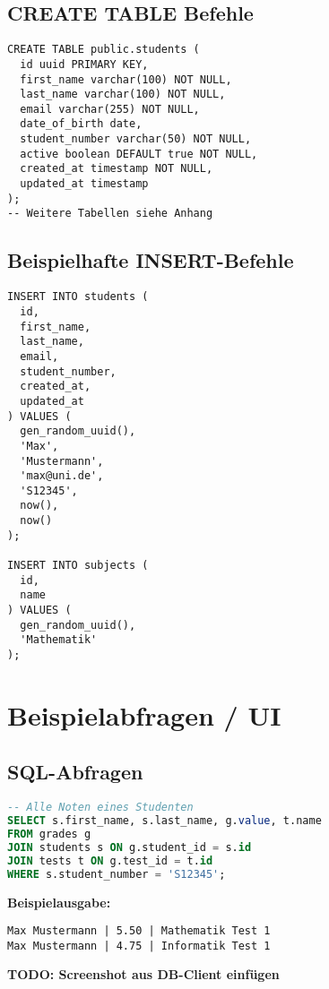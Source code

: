 \documentclass[12pt,a4paper]{article}
\begin{document}
    \subsection{CREATE TABLE Befehle}
    \begin{lstlisting}
CREATE TABLE public.students (
  id uuid PRIMARY KEY,
  first_name varchar(100) NOT NULL,
  last_name varchar(100) NOT NULL,
  email varchar(255) NOT NULL,
  date_of_birth date,
  student_number varchar(50) NOT NULL,
  active boolean DEFAULT true NOT NULL,
  created_at timestamp NOT NULL,
  updated_at timestamp
);
-- Weitere Tabellen siehe Anhang
    \end{lstlisting}

    \subsection{Beispielhafte INSERT-Befehle}
    \begin{lstlisting}
INSERT INTO students (
  id,
  first_name,
  last_name,
  email,
  student_number,
  created_at,
  updated_at
) VALUES (
  gen_random_uuid(),
  'Max',
  'Mustermann',
  'max@uni.de',
  'S12345',
  now(),
  now()
);

INSERT INTO subjects (
  id,
  name
) VALUES (
  gen_random_uuid(),
  'Mathematik'
);
    \end{lstlisting}

    \section{Beispielabfragen / UI}

    \subsection{SQL-Abfragen}
    \begin{lstlisting}[language=SQL]
-- Alle Noten eines Studenten
SELECT s.first_name, s.last_name, g.value, t.name
FROM grades g
JOIN students s ON g.student_id = s.id
JOIN tests t ON g.test_id = t.id
WHERE s.student_number = 'S12345';
    \end{lstlisting}

    \textbf{Beispielausgabe:}
    \begin{verbatim}
Max Mustermann | 5.50 | Mathematik Test 1
Max Mustermann | 4.75 | Informatik Test 1
    \end{verbatim}

    \textbf{TODO: Screenshot aus DB-Client einfügen}
    \newpage
\end{document}
